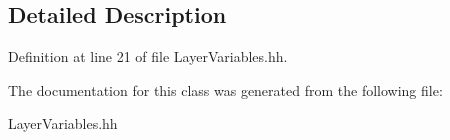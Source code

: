 \subsection{Detailed Description}


Definition at line 21 of file Layer\-Variables.\-hh.



The documentation for this class was generated from the following file\-:\begin{DoxyCompactItemize}
\item 
Layer\-Variables.\-hh\end{DoxyCompactItemize}
